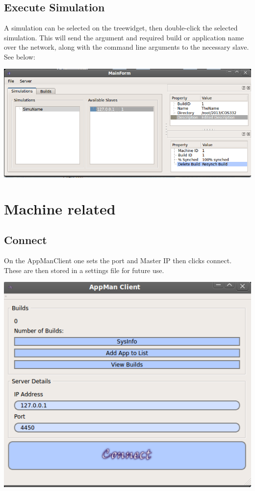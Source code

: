 \documentclass[a4paper,12pt,final]{article}
\begin{document}
\subsection{Execute Simulation}
A simulation can be selected on the treewidget, then double-click the selected simulation. This will send the argument and required build or application name over the network, along with the command line arguments to the necessary slave. See below:

\begin{center}
  	\includegraphics[scale=0.4]{ClickToRunSim.png}
 \end{center}

\section{Machine related}

\subsection{Connect}
On the AppManClient one sets the port and Master IP then clicks connect. These are then stored in a settings file for future use. 

\begin{center}
  	\includegraphics[scale=0.4]{InterfaceLinux_Client.png}
 \end{center}
\end{document}
